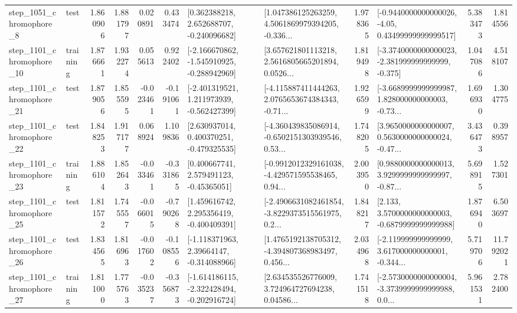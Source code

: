\begin{tabular}{llrrrrllrlrr}
  step\_1051\_chromophore\_8 &      test &      1.860906 &    1.881797 &      0.020891 &  0.433474 &    [0.362388218, 2.652688707, -0.240096682] &  [1.047386125263259, 4.5061869979394205, -0.336... &       1.978365 &  [-0.9440000000000026, -4.05, 0.43499999999999517] &            5.383473 &          1.814556 \\
 step\_1101\_chromophore\_10 &  training &      1.876661 &    1.932274 &      0.055613 &  0.922402 &  [-2.166670862, -1.545910925, -0.288942969] &  [3.657621801113218, 2.5616805665201894, 0.0526... &       1.819498 &  [-3.3740000000000023, -2.381999999999999, -0.375] &            1.047086 &          4.518107 \\
 step\_1101\_chromophore\_21 &      test &      1.879056 &    1.855595 &     -0.023461 & -0.191061 &   [-2.401319521, 1.211973939, -0.562427399] &  [-4.115887411444263, 2.0765653674384343, -0.71... &       1.926599 &  [-3.6689999999999987, 1.828000000000003, -0.73... &            1.696930 &          1.304775 \\
 step\_1101\_chromophore\_22 &      test &      1.848253 &    1.917177 &      0.068924 &  1.109836 &    [2.630937014, 0.400370251, -0.479325535] &  [-4.360439835086914, -0.6502151303939546, 0.53... &       1.748205 &  [3.9650000000000007, 0.5630000000000024, -0.47... &            3.436473 &          0.398957 \\
 step\_1101\_chromophore\_23 &  training &      1.886104 &    1.852643 &     -0.033461 & -0.331865 &     [0.400667741, 2.579491123, -0.45365051] &  [-0.9912012329161038, -4.429571595538465, 0.94... &       2.003950 &  [0.9880000000000013, 3.9299999999999997, -0.87... &            5.698915 &          1.527301 \\
 step\_1101\_chromophore\_25 &      test &      1.811572 &    1.745557 &     -0.066015 & -0.790268 &    [1.459616742, 2.295356419, -0.400409391] &  [-2.4906631082461854, -3.8229373515561975, 0.2... &       1.848217 &   [2.133, 3.5700000000000003, -0.6879999999999988] &            1.876940 &          6.503697 \\
 step\_1101\_chromophore\_26 &      test &      1.834565 &    1.816963 &     -0.017602 & -0.108556 &    [-1.118371963, 2.39664147, -0.314088966] &  [1.4765192138705312, -4.394807368983497, 0.456... &       2.034968 &  [-2.119999999999999, 3.617000000000001, -0.344... &            5.719706 &         11.792021 \\
 step\_1101\_chromophore\_27 &  training &      1.811000 &    1.775763 &     -0.035237 & -0.356873 &  [-1.614186115, -2.322428494, -0.202916724] &  [2.634535526776009, 3.724964727694238, 0.04586... &       1.741518 &  [-2.5730000000000004, -3.3739999999999988, 0.0... &            5.961531 &          2.782400 \\

\end{tabular}

